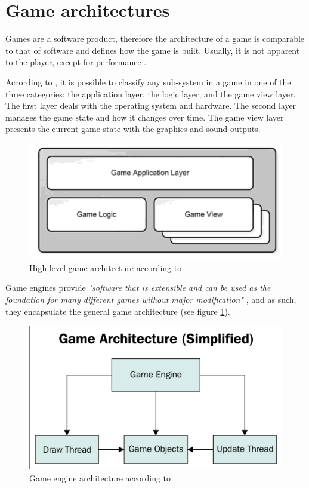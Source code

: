 \documentclass[runningheads]{llncs}
\begin{document}
\section{Game architectures} \label{sec:game-architecture}
Games are a  software product, therefore the  architecture of a game is comparable to that of software and defines how the game is built. Usually, it is not apparent to the player, except for performance \cite{croft_2004}.

According to \cite{mcshaffry_2009}, it is possible to classify any sub-system in a game in one of the three categories: the application layer, the logic layer, and the game view layer. The first layer deals with the operating system and hardware. The second layer manages the game state and how it changes over time. The game view layer presents the current game state with the graphics and sound outputs.

\begin{figure}[!h]
    \centering
    \includegraphics[scale=1.1]{src/GameArchitecture.png}
    \caption{High-level game architecture according to \cite{mcshaffry_2009}}
\end{figure}

Game engines provide \textit{"software that is extensible and can be used as the foundation for many different games without major modification"} \cite{gregory_2019}, and as such, they encapsulate the general game architecture (see figure \ref{fig:Simplified_game_engine}).

\begin{figure}[!h]
    \centering
    \includegraphics[scale=1.5]{src/hci2020-images/Game_Architecture_Raul_Portales.jpg}
    \caption{Game engine architecture according to \cite{portales}}
    \label{fig:Simplified_game_engine}
\end{figure}
\end{document}
